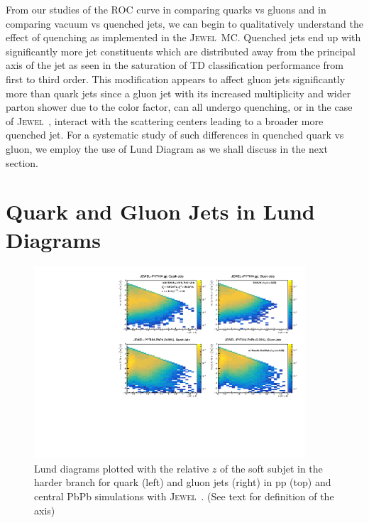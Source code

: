 \documentclass[notoc]{JHEP3}
\newcommand{\jw}{\textsc{Jewel}~}
\begin{document}
From our studies of the ROC curve in comparing quarks vs gluons and in comparing vacuum vs quenched jets, we can begin to qualitatively understand the effect of quenching as implemented in the \jw MC. Quenched jets end up with significantly more jet constituents which are distributed away from the principal axis of the jet as seen in the saturation of TD classification performance from first to third order. This modification appears to affect gluon jets significantly more than quark jets since a gluon jet with its increased multiplicity and wider parton shower due to the color factor, can all undergo quenching, or in the case of \jw, interact with the scattering centers leading to a broader more quenched jet. For a systematic study of such differences in quenched quark vs gluon, we employ the use of Lund Diagram as we shall discuss in the next section.   

\section{Quark and Gluon Jets in Lund Diagrams}
\label{sec:lund}

\begin{figure}[h]
	\centering
	\includegraphics[width=0.9\textwidth]{plots/Individual_LundDiagrams_zrel.pdf}
	\caption{Lund diagrams plotted with the relative $z$ of the soft subjet in the harder branch for quark (left) and gluon jets (right) in pp (top) and central PbPb simulations with \jw. (See text for definition of the axis)}
\label{fig:Lund_full}
\end{figure}
\end{document}
